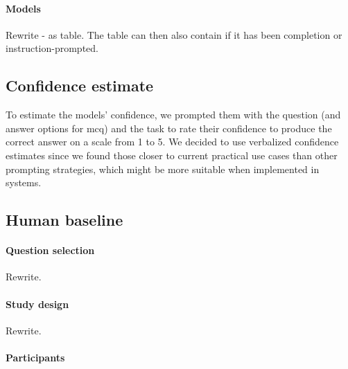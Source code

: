 \documentclass[11pt, oneside]{article}
\begin{document}
\begin{refsection}
\paragraph{Models}
Rewrite - as table. The table can then also contain if it has been completion or instruction-prompted.

\subsection{Confidence estimate}
To estimate the models' confidence, we prompted them with the question (and answer options for \gls{mcq}) and the task to rate their confidence to produce the correct answer on a scale from 1 to 5. 
We decided to use verbalized confidence estimates\autocite{xiong2023llms} since we found those closer to current practical use cases than other prompting strategies, which might be more suitable when implemented in systems.

\subsection{Human baseline}


\paragraph{Question selection} \label{sec:subset-selection}
Rewrite.

\paragraph{Study design}
Rewrite.

\paragraph{Participants}



\end{refsection}
\end{document}
